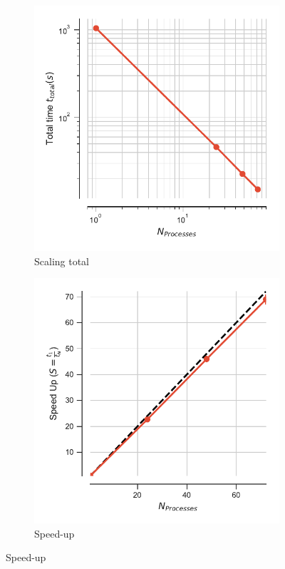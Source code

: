 \begin{figure}
\centering
\begin{subfigure}{.4\textwidth}
  \includegraphics[width=\linewidth]{figures/split-ga-t_total.pdf}
  \caption{Scaling total}
  \label{fig:MPIscaling-split-ga}
\end{subfigure}
\hfill
\begin{subfigure}{.4\textwidth}
  \includegraphics[width=\linewidth]{figures/split-ga-speed_up.pdf}
  \caption{Speed-up}
  \label{fig:MPIspeedup-split-ga}
\end{subfigure}
\bigskip


\end{figure}
